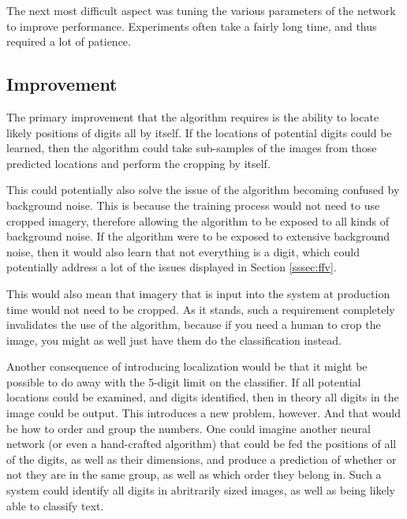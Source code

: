 \documentclass[12pt]{article}
\begin{document}
The next most difficult aspect was tuning the various parameters of the network to improve performance.
Experiments often take a fairly long time, and thus required a lot of patience.

\subsection{Improvement} \label{sssec:improvement}
The primary improvement that the algorithm requires is the ability to locate likely positions of digits all by itself.
If the locations of potential digits could be learned, then the algorithm could take sub-samples of the images from those predicted locations and perform the cropping by itself.

This could potentially also solve the issue of the algorithm becoming confused by background noise. 
This is because the training process would not need to use cropped imagery, therefore allowing the algorithm to be exposed to all kinds of background noise.
If the algorithm were to be exposed to extensive background noise, then it would also learn that not everything is a digit, which could potentially address a lot of the issues displayed in Section \ref{sssec:ffv}.

This would also mean that imagery that is input into the system at production time would not need to be cropped.
As it stands, such a requirement completely invalidates the use of the algorithm, because if you need a human to crop the image, you might as well just have them do the classification instead.

Another consequence of introducing localization would be that it might be possible to do away with the 5-digit limit on the classifier.
If all potential locations could be examined, and digits identified, then in theory all digits in the image could be output.
This introduces a new problem, however. And that would be how to order and group the numbers. 
One could imagine another neural network (or even a hand-crafted algorithm) that could be fed the positions of all of the digits, as well as their dimensions, and produce a prediction of whether or not they are in the same group, as well as which order they belong in.
Such a system could identify all digits in abritrarily sized images, as well as being likely able to classify text. 
\end{document}
